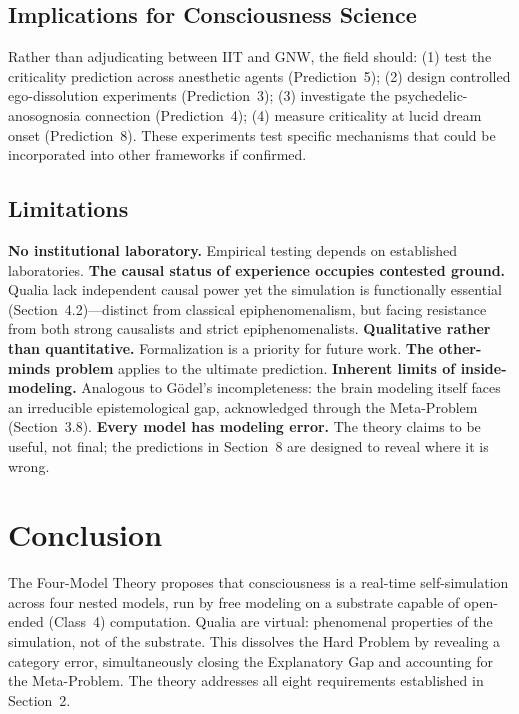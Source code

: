 \documentclass[12pt]{article}
\begin{document}
\subsection{Implications for Consciousness Science}

Rather than adjudicating between IIT and GNW, the field should: (1) test the criticality prediction across anesthetic agents (Prediction~5); (2) design controlled ego-dissolution experiments (Prediction~3); (3) investigate the psychedelic-anosognosia connection (Prediction~4); (4) measure criticality at lucid dream onset (Prediction~8). These experiments test specific mechanisms that could be incorporated into other frameworks if confirmed.


\subsection{Limitations}

\textbf{No institutional laboratory.} Empirical testing depends on established laboratories. \textbf{The causal status of experience occupies contested ground.} Qualia lack independent causal power yet the simulation is functionally essential (Section~4.2)---\hspace{0pt}distinct from classical epiphenomenalism, but facing resistance from both strong causalists and strict epiphenomenalists. \textbf{Qualitative rather than quantitative.} Formalization is a priority for future work. \textbf{The other-minds problem} applies to the ultimate prediction. \textbf{Inherent limits of inside-modeling.} Analogous to G{\"o}del's incompleteness: the brain modeling itself faces an irreducible epistemological gap, acknowledged through the Meta-Problem (Section~3.8). \textbf{Every model has modeling error.} The theory claims to be useful, not final; the predictions in Section~8 are designed to reveal where it is wrong.



\section{Conclusion}

The Four-Model Theory proposes that consciousness is a real-time self-simulation across four nested models, run by free modeling on a substrate capable of open-ended (Class~4) computation. Qualia are virtual: phenomenal properties of the simulation, not of the substrate. This dissolves the Hard Problem by revealing a category error, simultaneously closing the Explanatory Gap and accounting for the Meta-Problem. The theory addresses all eight requirements established in Section~2.
\end{document}
